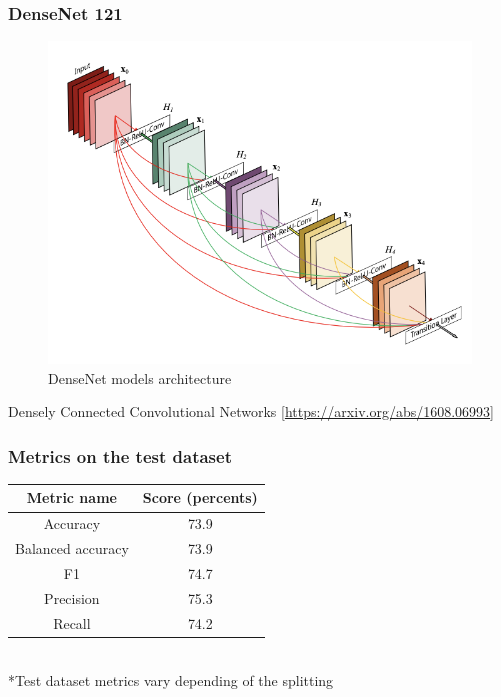 \documentclass{beamer}
\begin{document}
\begin{frame}
\frametitle{DenseNet 121}

\begin{figure}
	\centering
	\includegraphics[scale=0.6]{images/model.png}
	\caption*{DenseNet models architecture} 
\end{figure}

\begin{center}
Densely Connected Convolutional Networks [\url{https://arxiv.org/abs/1608.06993}]
\end{center}

\end{frame}


\begin{frame}
\frametitle{Metrics on the test dataset}

\begin{center}
\begin{tabular}{ | c | c | } 
  \hline
Metric name & Score (percents) \\ 
  \hline
Accuracy & 73.9 \\ 
  \hline
Balanced accuracy & 73.9  \\ 
  \hline
F1 & 74.7  \\ 
  \hline
Precision & 75.3  \\ 
  \hline
Recall & 74.2 \\ 
  \hline
\end{tabular}
\\
*Test dataset metrics vary depending of the splitting
\end{center}

\end{frame}
\end{document}
